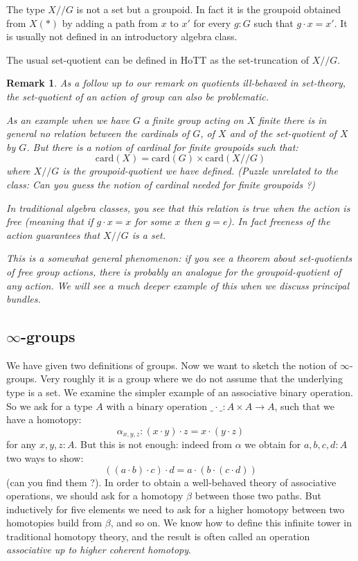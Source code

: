 \documentclass{article}
\newcommand{\sse}[1]{\medbreak \subsection{#1}}
\renewcommand{\r}{\rightarrow}
\newtheorem{remark}{Remark}
\begin{document}
The type $X//G$ is not a set but a groupoid. In fact it is the groupoid obtained from $X(*)$ by adding a path from $x$ to $x'$ for every $g:G$ such that $g\cdot x = x'$. It is usually not defined in an introductory algebra class. 

The usual set-quotient can be defined in HoTT as the set-truncation of $X//G$.%

\begin{remark}
As a follow up to our remark on quotients ill-behaved in set-theory, the set-quotient of an action of group can also be problematic. 

As an example when we have $G$ a finite group acting on $X$ finite there is in general no relation between the cardinals of $G$, of $X$ and of the set-quotient of $X$ by $G$. But there is a notion of cardinal for finite groupoids such that:
\[\mathrm{card}(X) = \mathrm{card}(G) \times \mathrm{card}(X//G)\]
where $X//G$ is the groupoid-quotient we have defined. (Puzzle unrelated to the class: Can you guess the notion of cardinal needed for finite groupoids ?)

In traditional algebra classes, you see that this relation is true when the action is free (meaning that if $g\cdot x =x$ for some $x$ then $g=e$). In fact freeness of the action guarantees that $X//G$ is a set.

This is a somewhat general phenomenon: if you see a theorem about set-quotients of free group actions, there is probably an analogue for the groupoid-quotient of any action. We will see a much deeper example of this when we discuss principal bundles. 
\end{remark}


\sse{$\infty$-groups}

We have given two definitions of groups. Now we want to sketch the notion of $\infty$-groups. Very roughly it is a group where we do not assume that the underlying type is a set. We examine the simpler example of an associative binary operation. So we ask for a type $A$ with a binary operation $\_\cdot\_ : A\times A \r A$, such that we have a homotopy:
\[\alpha_{x,y,z} : (x\cdot y) \cdot z = x\cdot (y\cdot z)\] 
for any $x,y,z:A$. But this is not enough: indeed from $\alpha$ we obtain for $a,b,c,d:A$ two ways to show:
\[((a\cdot b)\cdot c )\cdot d = a\cdot(b\cdot (c\cdot d))\]
(can you find them ?). In order to obtain a well-behaved theory of associative operations, we should ask for a homotopy $\beta$ between those two paths. But inductively for five elements we need to ask for a higher homotopy between two homotopies build from $\beta$, and so on. We know how to define this infinite tower in traditional homotopy theory, and the result is often called an operation \emph{associative up to higher coherent homotopy}.
\end{document}
